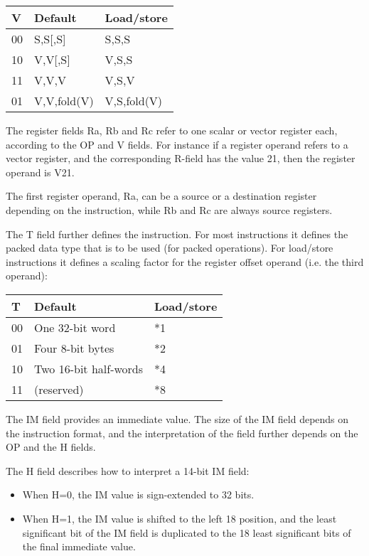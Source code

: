 \begin{tabular}{|l|l|l|}
  \hline
  \textbf{V} & \textbf{Default} & \textbf{Load/store} \\
  \hline
  00 & S,S[,S] & S,S,S \\
  \hline
  10 & V,V[,S] & V,S,S \\
  \hline
  11 & V,V,V & V,S,V \\
  \hline
  01 & V,V,fold(V) & V,S,fold(V) \\
  \hline
\end{tabular}

The register fields Ra, Rb and Rc refer to one scalar or vector register each,
according to the OP and V fields. For instance if a register operand refers to
a vector register, and the corresponding R-field has the value 21, then the
register operand is V21.

The first register operand, Ra, can be a source or a destination register
depending on the instruction, while Rb and Rc are always source registers.

The T field further defines the instruction. For most instructions it defines
the packed data type that is to be used (for packed operations). For load/store
instructions it defines a scaling factor for the register offset operand (i.e.
the third operand):

\begin{tabular}{|l|l|l|}
  \hline
  \textbf{T} & \textbf{Default} & \textbf{Load/store} \\
  \hline
  00 & One 32-bit word & *1 \\
  \hline
  01 & Four 8-bit bytes & *2 \\
  \hline
  10 & Two 16-bit half-words & *4 \\
  \hline
  11 & (reserved) & *8 \\
  \hline
\end{tabular}

The IM field provides an immediate value. The size of the IM field depends on
the instruction format, and the interpretation of the field further depends on
the OP and the H fields.

The H field describes how to interpret a 14-bit IM field:
\begin{itemize}
  \item When H=0, the IM value is sign-extended to 32 bits.
  \item When H=1, the IM value is shifted to the left 18 position, and the
        least significant bit of the IM field is duplicated to the 18 least
        significant bits of the final immediate value.
\end{itemize}

